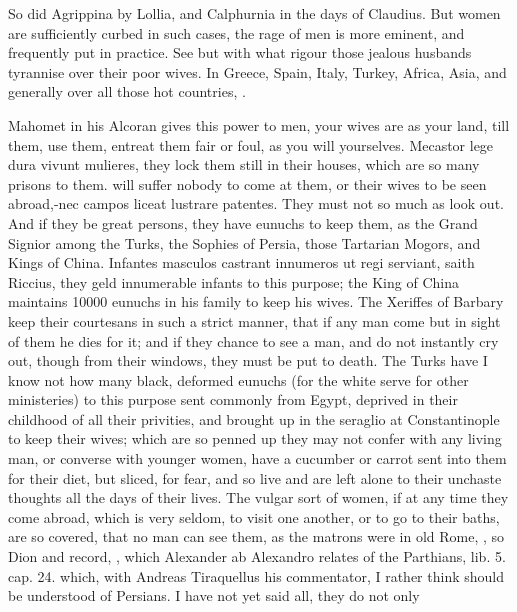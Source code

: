 So did Agrippina by Lollia, and Calphurnia in the days of Claudius. But
women are sufficiently curbed in such cases, the rage of men is more
eminent, and frequently put in practice. See but with what rigour those
jealous husbands tyrannise over their poor wives. In Greece, Spain,
Italy, Turkey, Africa, Asia, and generally over all those hot
countries, .

Mahomet in his Alcoran gives this power to men, your wives are as your
land, till them, use them, entreat them fair or foul, as you will
yourselves. Mecastor lege dura vivunt mulieres, they lock them
still in their houses, which are so many prisons to them. will suffer
nobody to come at them, or their wives to be seen abroad,-nec campos
liceat lustrare patentes. They must not so much as look out. And if
they be great persons, they have eunuchs to keep them, as the Grand
Signior among the Turks, the Sophies of Persia, those Tartarian Mogors,
and Kings of China. Infantes masculos castrant innumeros ut regi
serviant, saith Riccius, they geld innumerable infants to this
purpose; the King of China maintains 10\thinspace{}000 eunuchs in his family
to keep his wives. The Xeriffes of Barbary keep their courtesans in
such a strict manner, that if any man come but in sight of them he dies
for it; and if they chance to see a man, and do not instantly cry out,
though from their windows, they must be put to death. The Turks have I
know not how many black, deformed eunuchs (for the white serve for
other ministeries) to this purpose sent commonly from Egypt, deprived
in their childhood of all their privities, and brought up in the
seraglio at Constantinople to keep their wives; which are so penned up
they may not confer with any living man, or converse with younger
women, have a cucumber or carrot sent into them for their diet, but
sliced, for fear, \etc{} and so live and are left alone to their unchaste
thoughts all the days of their lives. The vulgar sort of women, if at
any time they come abroad, which is very seldom, to visit one another,
or to go to their baths, are so covered, that no man can see them, as
the matrons were in old Rome, , so
Dion and \Seneca record, , which
Alexander ab Alexandro relates of the Parthians, lib. 5. cap. 24.
which, with Andreas Tiraquellus his commentator, I rather think should
be understood of Persians. I have not yet said all, they do not only
